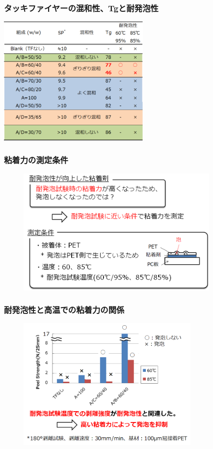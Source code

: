 \documentclass[12pt, dvipdfmx]{beamer}
\begin{document}
\begin{frame}
	\frametitle{タッキファイヤーの混和性、Tgと耐発泡性}
		\centering
			\includegraphics[width=75mm]{TF_table.png}
\end{frame}

\begin{frame}\frametitle{粘着力の測定条件}
	\begin{figure}
		\begin{center}
			\includegraphics[width=100mm]{adh_1.png}
		\end{center}
	\end{figure}
\end{frame}

%
\begin{frame}\frametitle{耐発泡性と高温での粘着力の関係}
	\begin{figure}
		\begin{center}
			\includegraphics[width=90mm]{adh_2.png}
		\end{center}
	\end{figure}
\end{frame}
\end{document}
